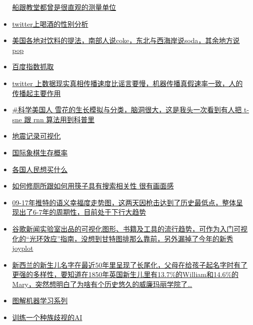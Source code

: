 \documentclass[]{book}
\begin{document}
\begin{itemize}
  \href{http://longstreet.typepad.com/thesciencebookstore/2016/03/measuring-things-with-ships.html}{船跟教堂都曾是很直观的测量单位}
\item
  \href{https://qz.com/486704/this-is-how-men-and-women-drink-according-to-twitter/}{twitter上喝酒的性别分析}
\item
  \href{http://popvssoda.com/}{美国各地对饮料的提法，南部人说coke，东北与西海岸说soda，其余地方说pop}
\item
  \href{https://mp.weixin.qq.com/s/b3g-VycUoLaZgTWkgznU9g}{百度指数抓取}
\item
  \href{http://science.sciencemag.org/content/359/6380/1146}{twitter 上数据现实真相传播速度比谣言要慢，机器传播真假速率一致，人的传播起主要作用}
\item
  \href{https://blogs.scientificamerican.com/sa-visual/in-silico-flurries/}{\#科学美国人 雪花的生长模拟与分类，脑洞很大，这是我头一次看到有人把 t-sne 跟 rnn 算法用到科普里}
\item
  \href{https://geovisualist.com/2015/06/22/visualizing-100-years-of-earthquakes/}{地震记录可视化}
\item
  \href{https://www.quora.com/What-are-the-chances-of-survival-of-individual-chess-pieces-in-average-games}{国际象棋生存概率}
\item
  \href{https://www.fixr.com/blog/2015/04/17/world-of-obsessions/}{各国人民想买什么}
\item
  \href{http://how-to-fix-a-toilet.com/}{如何修厕所跟如何用筷子具有搜索相关性 很有画面感}
\item
  \href{http://hedonometer.org/index.html?from=2008-09-10}{09-17年推特的语义幸福度走势图，这两天因枪击达到了历史最低点，整体呈现出了6-7年的周期性，目前处于下行大趋势}
\item
  \href{http://visualizationuniverse.com/}{谷歌新闻实验室出品的可视化图形、书籍及工具的流行趋势，可作为入门可视化的``光环效应''指南，没想到甘特图排那么靠前，另外漏掉了今年的新秀joyplot}
\item
  \href{https://www.statschat.org.nz/2018/01/08/long-tail-of-baby-names/}{新西兰的新生儿名字在最近50年里呈现了长尾化，父母在给孩子起名字时有了更强的多样性，要知道在1850年英国新生儿里有13.7\%的William和14.6\%的Mary，突然想明白了为啥有个历史悠久的威廉玛丽学院了\ldots{}}
\item
  \href{http://www.r2d3.us/\%E5\%9B\%BE\%E8\%A7\%A3\%E6\%9C\%BA\%E5\%99\%A8\%E5\%AD\%A6\%E4\%B9\%A0/}{图解机器学习系列}
\item
  \href{https://notstatschat.rbind.io/2018/09/27/how-to-write-a-racist-ai-in-r-without-really-trying/}{训练一个种族歧视的AI}
\end{itemize}
\end{document}
